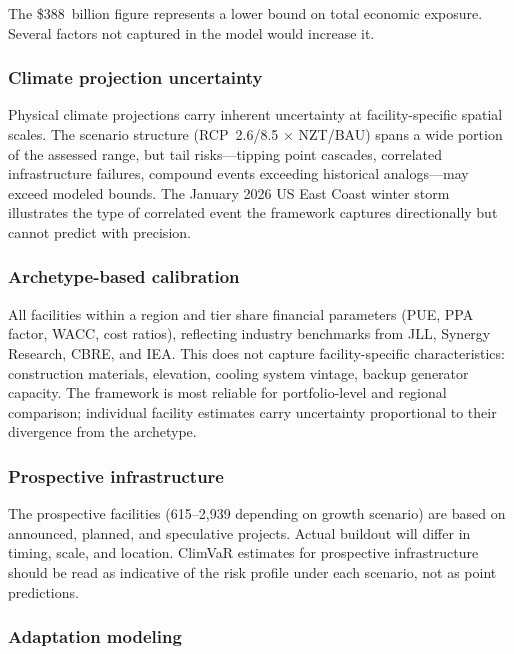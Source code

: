 \begin{twocolbody}

\noindent The \$388~billion figure represents a lower bound on total economic exposure. Several factors not captured in the model would increase it.

\subsubsection*{Climate projection uncertainty}

Physical climate projections carry inherent uncertainty at facility-specific spatial scales. The scenario structure (RCP~2.6/8.5 $\times$ NZT/BAU) spans a wide portion of the assessed range, but tail risks---tipping point cascades, correlated infrastructure failures, compound events exceeding historical analogs---may exceed modeled bounds. The January 2026 US East Coast winter storm illustrates the type of correlated event the framework captures directionally but cannot predict with precision.

\subsubsection*{Archetype-based calibration}

All facilities within a region and tier share financial parameters (PUE, PPA factor, WACC, cost ratios), reflecting industry benchmarks from JLL, Synergy Research, CBRE, and IEA. This does not capture facility-specific characteristics: construction materials, elevation, cooling system vintage, backup generator capacity. The framework is most reliable for portfolio-level and regional comparison; individual facility estimates carry uncertainty proportional to their divergence from the archetype.

\subsubsection*{Prospective infrastructure}

The prospective facilities (615--2,939 depending on growth scenario) are based on announced, planned, and speculative projects. Actual buildout will differ in timing, scale, and location. ClimVaR estimates for prospective infrastructure should be read as indicative of the risk profile under each scenario, not as point predictions.

\subsubsection*{Adaptation modeling}


\end{twocolbody}
